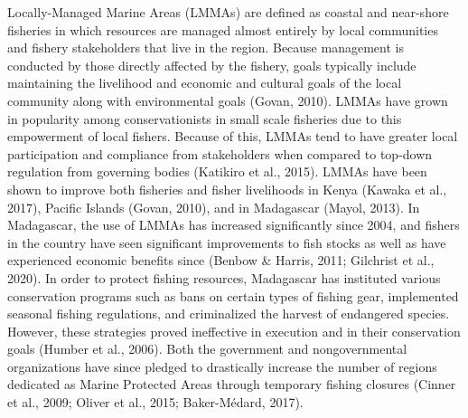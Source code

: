 \documentclass[
]{article}
\begin{document}
Locally-Managed Marine Areas (LMMAs) are defined as coastal and near-shore fisheries in which resources are managed almost entirely by local communities and fishery stakeholders that live in the region. Because management is conducted by those directly affected by the fishery, goals typically include maintaining the livelihood and economic and cultural goals of the local community along with environmental goals (Govan, 2010). LMMAs have grown in popularity among conservationists in small scale fisheries due to this empowerment of local fishers. Because of this, LMMAs tend to have greater local participation and compliance from stakeholders when compared to top-down regulation from governing bodies (Katikiro et al., 2015). LMMAs have been shown to improve both fisheries and fisher livelihoods in Kenya (Kawaka et al., 2017), Pacific Islands (Govan, 2010), and in Madagascar (Mayol, 2013). In Madagascar, the use of LMMAs has increased significantly since 2004, and fishers in the country have seen significant improvements to fish stocks as well as have experienced economic benefits since (Benbow \& Harris, 2011; Gilchrist et al., 2020). In order to protect fishing resources, Madagascar has instituted various conservation programs such as bans on certain types of fishing gear, implemented seasonal fishing regulations, and criminalized the harvest of endangered species. However, these strategies proved ineffective in execution and in their conservation goals (Humber et al., 2006). Both the government and nongovernmental organizations have since pledged to drastically increase the number of regions dedicated as Marine Protected Areas through temporary fishing closures (Cinner et al., 2009; Oliver et al., 2015; Baker-Médard, 2017).
\end{document}
